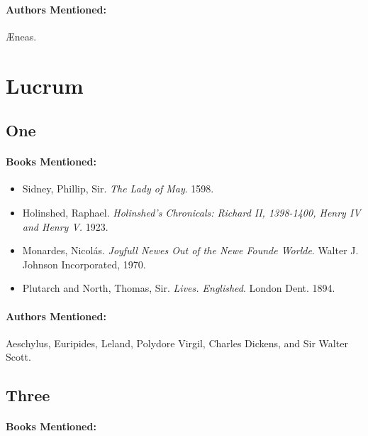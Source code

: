 \documentclass[12pt]{article}
\providecommand{\tightlist}{%
  \setlength{\itemsep}{0pt}\setlength{\parskip}{0pt}}
\begin{document}
\paragraph{Authors Mentioned:}\label{authors-mentioned-5}

Æneas.

\pagebreak 
\section{Lucrum}\label{lucrum}

\subsection{One}\label{one-1}

\paragraph{Books Mentioned:}\label{books-mentioned-9}

\begin{itemize}
\tightlist
\item
  Sidney, Phillip, Sir. \emph{The Lady of May}. 1598.
\item
  Holinshed, Raphael. \emph{Holinshed's Chronicals: Richard II, 1398-1400, Henry IV and Henry V.} 1923.
\item
  Monardes, Nicolás. \emph{Joyfull Newes Out of the Newe Founde Worlde}. Walter J. Johnson Incorporated, 1970.
\item
  Plutarch and North, Thomas, Sir. \emph{Lives. Englished}. London Dent. 1894.
\end{itemize}

\paragraph{Authors Mentioned:}\label{authors-mentioned-6}

Aeschylus, Euripides, Leland, Polydore Virgil, Charles Dickens, and Sir Walter Scott.

\subsection{Three}\label{three-1}

\paragraph{Books Mentioned:}\label{books-mentioned-10}
\end{document}
